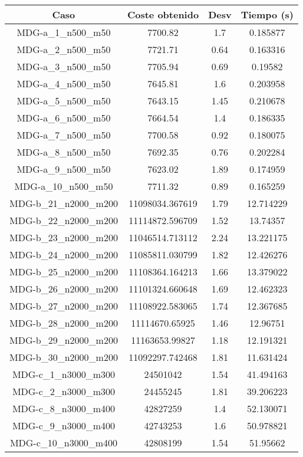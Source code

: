 \documentclass{article}
\begin{document}
\begin{table}[H]
	\centering
	\begin{tabular}{|cccc|}
		\hline
		Caso & Coste obtenido & Desv & Tiempo (s)\\ \hline
		MDG-a\_1\_n500\_m50 & 7700.82 & 1.7 & 0.185877\\
		MDG-a\_2\_n500\_m50 & 7721.71 & 0.64 & 0.163316\\
		MDG-a\_3\_n500\_m50 & 7705.94 & 0.69 & 0.19582\\
		MDG-a\_4\_n500\_m50 & 7645.81 & 1.6 & 0.203958\\
		MDG-a\_5\_n500\_m50 & 7643.15 & 1.45 & 0.210678\\
		MDG-a\_6\_n500\_m50 & 7664.54 & 1.4 & 0.186335\\
		MDG-a\_7\_n500\_m50 & 7700.58 & 0.92 & 0.180075\\
		MDG-a\_8\_n500\_m50 & 7692.35 & 0.76 & 0.202284\\
		MDG-a\_9\_n500\_m50 & 7623.02 & 1.89 & 0.174959\\
		MDG-a\_10\_n500\_m50 & 7711.32 & 0.89 & 0.165259\\
		MDG-b\_21\_n2000\_m200 & 11098034.367619 & 1.79 & 12.714229\\
		MDG-b\_22\_n2000\_m200 & 11114872.596709 & 1.52 & 13.74357\\
		MDG-b\_23\_n2000\_m200 & 11046514.713112 & 2.24 & 13.221175\\
		MDG-b\_24\_n2000\_m200 & 11085811.030799 & 1.82 & 12.426276\\
		MDG-b\_25\_n2000\_m200 & 11108364.164213 & 1.66 & 13.379022\\
		MDG-b\_26\_n2000\_m200 & 11101324.660648 & 1.69 & 12.462323\\
		MDG-b\_27\_n2000\_m200 & 11108922.583065 & 1.74 & 12.367685\\
		MDG-b\_28\_n2000\_m200 & 11114670.65925 & 1.46 & 12.96751\\
		MDG-b\_29\_n2000\_m200 & 11163653.99827 & 1.18 & 12.191321\\
		MDG-b\_30\_n2000\_m200 & 11092297.742468 & 1.81 & 11.631424\\
		MDG-c\_1\_n3000\_m300 & 24501042 & 1.54 & 41.494163\\
		MDG-c\_2\_n3000\_m300 & 24455245 & 1.81 & 39.206223\\
		MDG-c\_8\_n3000\_m400 & 42827259 & 1.4 & 52.130071\\
		MDG-c\_9\_n3000\_m400 & 42743253 & 1.6 & 50.978821\\
		MDG-c\_10\_n3000\_m400 & 42808199 & 1.54 & 51.95662\\

\end{tabular}
\end{table}
\end{document}
